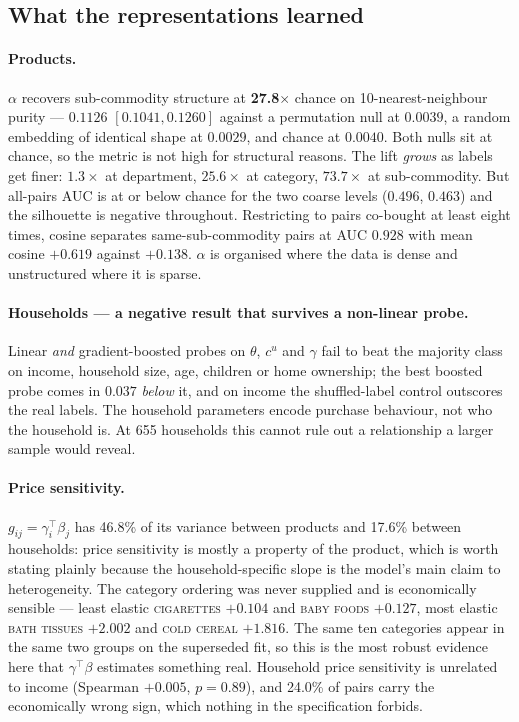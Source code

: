 \documentclass[11pt]{article}
\begin{document}
\subsection{What the representations learned}
\label{sec:repr}

\paragraph{Products.} $\alpha$ recovers sub-commodity structure at \textbf{27.8$\times$}
chance on 10-nearest-neighbour purity --- $0.1126$ $[0.1041,0.1260]$ against a
permutation null at $0.0039$, a random embedding of identical shape at $0.0029$, and chance
at $0.0040$. Both nulls sit at chance, so the metric is not high for structural reasons. The
lift \emph{grows} as labels get finer: $1.3\times$ at department, $25.6\times$ at category,
$73.7\times$ at sub-commodity. But all-pairs AUC is at or below chance for the two coarse
levels ($0.496$, $0.463$) and the silhouette is negative throughout. Restricting to pairs
co-bought at least eight times, cosine separates same-sub-commodity pairs at AUC $0.928$
with mean cosine $+0.619$ against $+0.138$. $\alpha$ is organised where the data is dense
and unstructured where it is sparse.

\paragraph{Households --- a negative result that survives a non-linear probe.} Linear
\emph{and} gradient-boosted probes on $\theta$, $c^u$ and $\gamma$ fail to beat the majority
class on income, household size, age, children or home ownership; the best boosted probe
comes in $0.037$ \emph{below} it, and on income the shuffled-label control outscores the
real labels. The household parameters encode purchase behaviour, not who the household is.
At 655 households this cannot rule out a relationship a larger sample would reveal.

\paragraph{Price sensitivity.} $g_{ij}=\gamma_i^{\top}\beta_j$ has 46.8\% of its variance
between products and 17.6\% between households: price sensitivity is mostly a property of
the product, which is worth stating plainly because the household-specific slope is the
model's main claim to heterogeneity. The category ordering was never supplied and is
economically sensible --- least elastic \textsc{cigarettes} $+0.104$ and \textsc{baby foods}
$+0.127$, most elastic \textsc{bath tissues} $+2.002$ and \textsc{cold cereal} $+1.816$. The
same ten categories appear in the same two groups on the superseded fit, so this is the most
robust evidence here that $\gamma^{\top}\beta$ estimates something real. Household price
sensitivity is unrelated to income (Spearman $+0.005$, $p=0.89$), and 24.0\% of pairs carry
the economically wrong sign, which nothing in the specification forbids.
\end{document}
